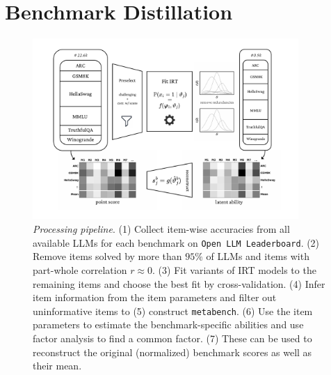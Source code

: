 \documentclass{article}
\begin{document}
\section{Benchmark Distillation}
\begin{figure}[h]
   \centering
   \includegraphics[width=0.9\textwidth]{figures/overview.pdf}
   \caption{\textit{Processing pipeline}. (1) Collect item-wise accuracies from all available LLMs for each benchmark on \texttt{Open LLM Leaderboard}. (2) Remove items solved by more than $95\%$ of LLMs and items with part-whole correlation $r \approx 0$. (3) Fit variants of IRT models to the remaining items and choose the best fit by cross-validation. (4) Infer item information from the item parameters and filter out uninformative items to (5) construct \texttt{metabench}. (6) Use the item parameters to estimate the benchmark-specific abilities and use factor analysis to find a common factor. (7) These can be used to reconstruct the original (normalized) benchmark scores as well as their mean.}
   \label{fig:overview}
\end{figure}
\end{document}
